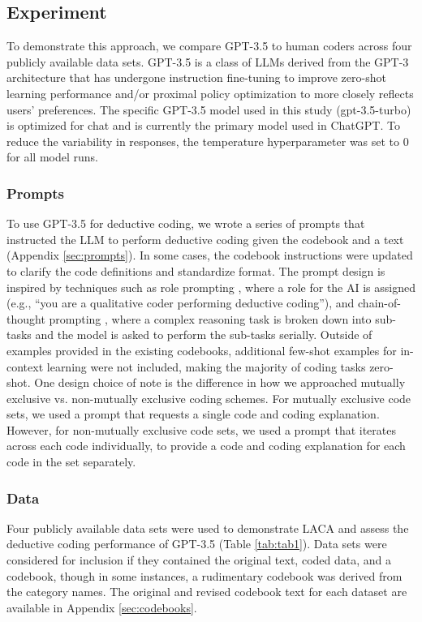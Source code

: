 \documentclass{article}
\begin{document}
\subsection{Experiment}
To demonstrate this approach, we compare GPT-3.5 \cite{noauthor_introducing_nodate, shen_chatgpt_2023} to human coders across four publicly available data sets.  GPT-3.5 is a class of LLMs derived from the GPT-3 \cite{brown_language_2020} architecture that has undergone instruction fine-tuning \cite{wei2021finetuned} to improve zero-shot learning performance and/or proximal policy optimization \cite{ouyang2022training} to more closely reflects users’ preferences.  The specific GPT-3.5 model used in this study (gpt-3.5-turbo) is optimized for chat and is currently the primary model used in ChatGPT.  To reduce the variability in responses, the temperature hyperparameter was set to 0 for all model runs.

\subsubsection{Prompts}
To use GPT-3.5 for deductive coding, we wrote a series of prompts that instructed the LLM to perform deductive coding given the codebook and a text (Appendix \ref{sec:prompts}). In some cases, the codebook instructions were updated to clarify the code definitions and standardize format.  The prompt design is inspired by techniques such as role prompting \cite{Schulhoff_Learn_Prompting_2022}, where a role for the AI is assigned (e.g., “you are a qualitative coder performing deductive coding”), and chain-of-thought prompting \cite{wei_chain--thought_2023}, where a complex reasoning task is broken down into sub-tasks and the model is asked to perform the sub-tasks serially.  Outside of examples provided in the existing codebooks, additional few-shot examples for in-context learning \cite{dong2022survey} were not included, making the majority of coding tasks zero-shot.  One design choice of note is the difference in how we approached mutually exclusive vs. non-mutually exclusive coding schemes.  For mutually exclusive code sets, we used a prompt that requests a single code and coding explanation. However, for non-mutually exclusive code sets, we used a prompt that iterates across each code individually, to provide a code and coding explanation for each code in the set separately.

\subsubsection{Data}
Four publicly available data sets were used to demonstrate LACA and assess the deductive coding performance of GPT-3.5 (Table \ref{tab:tab1}). Data sets were considered for inclusion if they contained the original text, coded data, and a codebook, though in some instances, a rudimentary codebook was derived from the category names. The original and revised codebook text for each dataset are available in Appendix \ref{sec:codebooks}.
\end{document}

